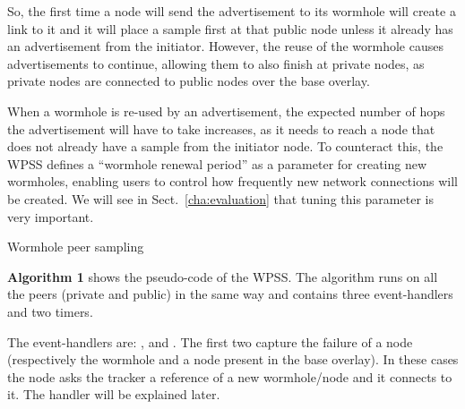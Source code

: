 So, the first time a node will send the advertisement to its wormhole will create a link to it and it will place a sample first at that public node unless it already has an advertisement from the initiator. However, the reuse of the wormhole causes advertisements to continue, allowing them to also finish at private nodes, as private nodes are connected to public nodes over the base overlay. 

When a wormhole is re-used by an advertisement, the expected number of hops the advertisement will have to take increases, as it needs to reach a node that does not already have a sample from the initiator node. To counteract this, the \ac{WPSS} defines a ``wormhole renewal period'' as a parameter for creating new wormholes, enabling users to control how frequently new network connections will be created. We will see in Sect.~\ref{cha:evaluation} that tuning this parameter is very important. 


\begin{algorithm}[H]






 \caption{Wormhole peer sampling}
\end{algorithm}

\textbf{Algorithm 1} shows the pseudo-code of the \ac{WPSS}. The algorithm runs on all the peers (private and public) in the same way and contains three event-handlers and two timers. 

The event-handlers are: \wormholeFailure, \baseOverlayFailure and \receivedAd. The first two capture the failure of a node (respectively the wormhole and a node present in the base overlay). In these cases the node asks the tracker a reference of a new wormhole/node and it connects to it. The \receivedAd handler will be explained later.

